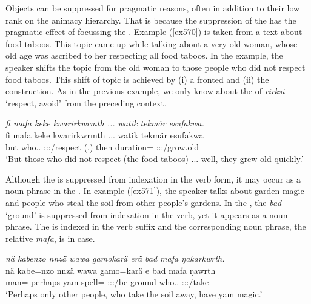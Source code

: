 Objects can be suppressed for pragmatic reasons, often in addition to their low rank on the animacy hierarchy. That is because the suppression of the  has the pragmatic effect of focussing the . Example (\ref{ex570}) is taken from a text about food taboos. This topic came up while talking about a very old woman, whose old age was ascribed to her respecting all food taboos. In the example, the speaker shifts the topic from the old woman to those people who did not respect food taboos. This shift of topic is achieved by (i) a fronted  and (ii) the  construction. As in the previous example, we only know about the  of \emph{rirksi} `respect, avoid' from the preceding context.

\begin{exe}
	\ex \emph{fi mafa keke kwarirkwrmth ... watik tekmär esufakwa.}\\
	\gll fi mafa keke kwarirkwrmth ... watik tekmär esufakwa\\
	but who.\Nsg.\Erg{} \Neg{} \Stpl:\Sbj:\Pst:\Dur/respect (.) then duration=\Priv{} \Stpl:\Sbj:\Pst:\Ipfv/grow.old\\
	\trans `But those who did not respect (the food taboos) ... well, they grew old quickly.'
	\label{ex570}
\end{exe}

Although the  is suppressed from indexation in the verb form, it may occur as a noun phrase in the . In example (\ref{ex571}), the speaker talks about garden magic and people who steal the soil from other people's gardens. In the , the  \emph{bad} `ground' is suppressed from indexation in the verb, yet it appears as a noun phrase. The  is indexed in the verb suffix and the corresponding noun phrase, the relative  \emph{mafa}, is in  case.

\begin{exe}
	\ex \emph{nä kabenzo nnzä wawa gamokarä erä bad mafa ŋakarkwrth.}\\
	\gll nä kabe=nzo nnzä wawa gamo=karä e bad mafa ŋawrth\\
	\Indf{} man=\Only{} perhaps yam spell=\Prop{} \Stpl:\Sbj:\Nonpast:\Ipfv/be ground who.\Erg.\Nsg{} \Stpl:\Sbj:\Nonpast:\Ipfv/take\\
	\trans `Perhaps only other people, who take the soil away, have yam magic.'\\
	\label{ex571}
\end{exe}


